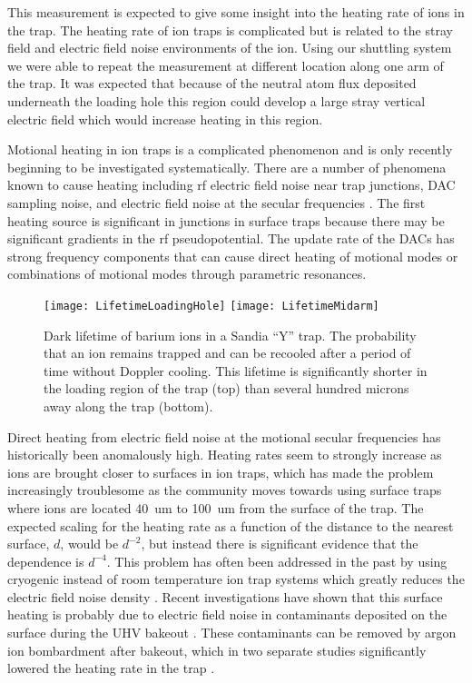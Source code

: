 This measurement is expected to give some insight into the heating rate of ions in the trap.  The heating rate of ion traps is complicated but is related to the stray field and electric field noise environments of the ion.  Using our shuttling system we were able to repeat the measurement at different location along one arm of the trap.  It was expected that because of the neutral atom flux deposited underneath the loading hole this region could develop a large stray vertical electric field which would increase heating in this region.  

Motional heating in ion traps is a complicated phenomenon and is only recently beginning to be investigated systematically.  There are a number of phenomena known to cause heating including rf electric field noise near trap junctions, DAC sampling noise, and electric field noise at the secular frequencies \cite{Blakestad:09, Blakestad:11}.  The first heating source is significant in junctions in surface traps because there may be significant gradients in the rf pseudopotential.  The update rate of the DACs has strong frequency components that can cause direct heating of motional modes or combinations of motional modes through parametric resonances.

\begin{figure}
	\centering
	\texttt{[image: LifetimeLoadingHole]}
	\texttt{[image: LifetimeMidarm]}
	\caption[Dark lifetime of barium ions in Sandia Y trap]{Dark lifetime of barium ions in a Sandia ``Y'' trap.  The probability that an ion remains trapped and can be recooled after a period of time without Doppler cooling.  This lifetime is significantly shorter in the loading region of the trap (top) than several hundred microns away along the trap (bottom).}
	\label{fig:lifetime}
\end{figure}

Direct heating from electric field noise at the motional secular frequencies has historically been anomalously high.  Heating rates seem to strongly increase as ions are brought closer to surfaces in ion traps, which has made the problem increasingly troublesome as the community moves towards using surface traps where ions are located 40~um to 100~um from the surface of the trap.  The expected scaling for the heating rate as a function of the distance to the nearest surface, $d$, would be $d^{-2}$, but instead there is significant evidence that the dependence is $d^{-4}$.  This problem has often been addressed in the past by using cryogenic instead of room temperature ion trap systems which greatly reduces the electric field noise density \cite{Niedermayr:14, Labaziewicz:08, Chiaverini:14}.  Recent investigations have shown that this surface heating is probably due to electric field noise in contaminants deposited on the surface during the UHV bakeout \cite{Safavi:11,Hite:12}.  These contaminants can be removed by argon ion bombardment after bakeout, which in two separate studies significantly lowered the heating rate in the trap \cite{Hite:12,Daniilidis:14}.

